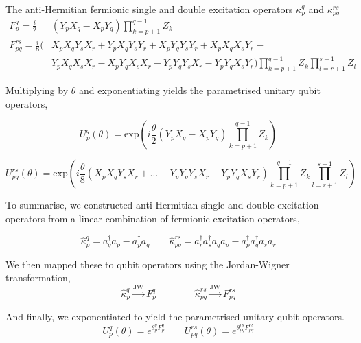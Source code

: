 The anti-Hermitian fermionic single and double excitation operators $\kappa_p^q$ and $\kappa_{pq}^{rs}$
\begin{align*}
    F_p^q = \frac{i}{2} & (Y_p X_q - X_p Y_q) \prod_{k=p+1}^{q-1} Z_k \\
    F_{pq}^{rs} = \frac{i}{8} (
      & X_p X_q Y_s X_r +
        Y_p X_q Y_s Y_r +
        X_p Y_q Y_s Y_r +
        X_p X_q X_s Y_r - \\
      & Y_p X_q X_s X_r -
        X_p Y_q X_s X_r -
        Y_p Y_q Y_s X_r -
        Y_p Y_q X_s Y_r )
    \prod_{k=p+1}^{q-1} Z_k
    \prod_{l=r+1}^{s-1} Z_l
\end{align*}

Multiplying by $\theta$ and exponentiating yields the parametrised unitary qubit operators,

\begin{equation*}
    U^q_p (\theta) =
    \text{exp} \left( i
    \frac{\theta}{2} (Y_p X_q - X_p Y_q) \prod_{k=p+1}^{q-1} Z_k \right)
\end{equation*}

\begin{equation*}
    U^{rs}_{pq} (\theta) = \text{exp} \left( i \frac{\theta}{8} (
    X_p X_q Y_s X_r
    + \dots -
    Y_p Y_q Y_s X_r -
    Y_p Y_q X_s Y_r )
    \prod_{k=p+1}^{q-1} Z_k
    \prod_{l=r+1}^{s-1} Z_l
    \right)
\end{equation*}

To summarise, we constructed anti-Hermitian single and double excitation operators from a linear combination of fermionic excitation operators,

\begin{equation*}
    \hat\kappa_p^q = a_q^\dagger a_p - a_p^\dagger a_q \qquad
    \hat\kappa_{pq}^{rs} =
    a_r^\dagger a_s^\dagger a_q a_p - a_p^\dagger a_q^\dagger a_s a_r
\end{equation*}\smallskip

We then mapped these to qubit operators using the Jordan-Wigner transformation,
\begin{equation*}
    \hat\kappa_p^q \xrightarrow{\text{JW}} F_p^q \qquad\qquad
    \hat\kappa_{pq}^{rs} \xrightarrow{\text{JW}} F_{pq}^{rs}
\end{equation*}

And finally, we exponentiated to yield the parametrised unitary qubit operators.
\begin{equation*}
    U^q_p (\theta) = e^{\theta^q_p F_p^q} \qquad
    U^{rs}_{pq}(\theta) = e^{\theta_{pq}^{rs} F_{pq}^{rs}}
\end{equation*}

